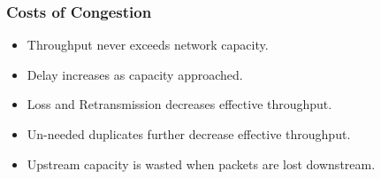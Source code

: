\subsubsection{Costs of Congestion}

\begin{itemize}
    \item Throughput never exceeds network capacity.
    \item Delay increases as capacity approached.
    \item Loss and Retransmission decreases effective throughput.
    \item Un-needed duplicates further decrease effective throughput.
    \item Upstream capacity is wasted when packets are lost downstream.
\end{itemize}